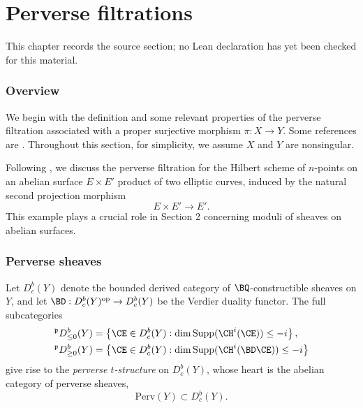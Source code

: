 \chapter{Perverse filtrations}
\label{hitchin-fibrations-abelian-surfaces-pw-chapter-02}

\begin{remark}
\label{hitchin-fibrations-abelian-surfaces-pw-chapter-02-source}
This chapter records the source section; no Lean declaration has yet been checked for this material.
\notready
\end{remark}

\label{sec1}

\subsection{Overview}
We begin with the definition and some relevant properties of the perverse filtration associated with a proper surjective morphism $\pi: X\rightarrow Y$. Some  references are \cite{BBD,dCM0,dCM1,WSB}.
Throughout this section, for simplicity, we assume $X$ and $Y$ are nonsingular.

Following \cite{dCHM3,Z,SZ}, we discuss the perverse filtration for the Hilbert scheme of $n$-points on an abelian surface $E \times E'$ product of two elliptic curves, induced by the natural  second projection morphism
\[
E \times E' \to E'.
\]
 This example plays a crucial role in Section 2 concerning moduli of sheaves on abelian surfaces.

\subsection{Perverse sheaves}
Let $D_c^b(Y)$ denote the bounded derived category of $\BQ$-constructible sheaves on $Y$, and let $\BD: D_c^b(Y)^{\mathrm{op}} \to D_c^b(Y)$ be the Verdier duality functor. The full subcategories
\begin{align*}
    ^ \mathfrak{p} D_{\leq 0}^b(Y) & = \left\{\CE \in D_c^b(Y): \dim \mathrm{Supp}(\CH^i(\CE)) \leq -i \right\}, \\
    ^ \mathfrak{p} D_{\geq 0}^b(Y) & = \left\{\CE \in D_c^b(Y): \dim \mathrm{Supp}(\CH^i(\BD\CE)) \leq -i \right\}
\end{align*}
give rise to the \emph{perverse $t$-structure} on $D_c^b(Y)$, whose heart is the abelian category of perverse sheaves,
\[
\mathrm{Perv}(Y) \subset D_c^b(Y).
\]

